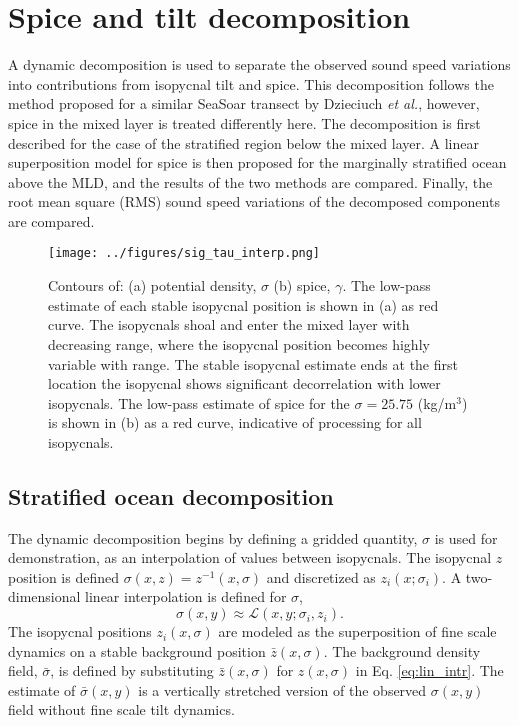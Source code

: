 \documentclass[preprint,NumberedRefs]{JASA}
\begin{document}
\section{\label{sec:decomposition}Spice and tilt decomposition}
A dynamic decomposition is used to separate the observed sound speed variations into contributions from isopycnal tilt and spice. This decomposition follows the method proposed for a similar SeaSoar transect by Dzieciuch \emph{et al.}\citep{dzieciuch2004}, however, spice in the mixed layer is treated differently here. The decomposition is first described for the case of the stratified region below the mixed layer. A linear superposition model for spice is then proposed for the marginally stratified ocean above the MLD, and the results of the two methods are compared. Finally, the root mean square (RMS) sound speed variations of the decomposed components are compared.

\begin{figure}
\texttt{[image: ../figures/sig\_tau\_interp.png]}
    \caption{\label{fig:cntrs}{Contours of: (a) potential density, $\sigma$ (b) spice, $\gamma$. The low-pass estimate of each stable isopycnal position is shown in (a) as red curve. The isopycnals shoal and enter the mixed layer with decreasing range, where the isopycnal position becomes highly variable with range. The stable isopycnal estimate ends at the first location the isopycnal shows significant decorrelation with lower isopycnals. The low-pass estimate of spice for the $\sigma=25.75$ (kg/m$^3$) is shown in (b) as a red curve, indicative of processing for all isopycnals.}}
\end{figure}

\subsection{Stratified ocean decomposition}
The dynamic decomposition begins by defining a gridded quantity, $\sigma$ is used for demonstration, as an interpolation of values between isopycnals. The isopycnal $z$ position is defined $\sigma(x, z) = z^{-1}(x, \sigma)$ and discretized as $z_i(x; \sigma_i)$. A two-dimensional linear interpolation is defined for $\sigma$,
\begin{equation}
    \sigma(x,y)\approx\mathcal{L}(x, y; \sigma_i, z_i).
    \label{eq:lin_intr}
\end{equation}
The isopycnal positions $z_i(x, \sigma)$ are modeled as the superposition of fine scale dynamics on a stable background position $\bar{z}(x, \sigma)$. The background density field, $\bar{\sigma}$, is defined by substituting $\bar{z}(x, \sigma)$ for $z(x, \sigma)$ in Eq. \eqref{eq:lin_intr}. The estimate of $\bar{\sigma}(x,y)$ is a vertically stretched version of the observed $\sigma(x,y)$ field without fine scale tilt dynamics.
\end{document}
